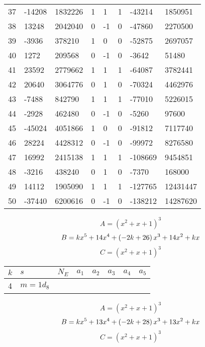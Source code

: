 \documentclass{amsart}
\begin{document}
\begin{longtable}{|l|l|l|lllll|}
37&-14208&1832226&1&1&1&-43214&1850951\\
38&13248&2042040&0&-1&0&-47860&2270500\\
39&-3936&378210&1&0&0&-52875&2697057\\
40&1272&209568&0&-1&0&-3642&51480\\
41&23592&2779662&1&1&1&-64087&3782441\\
42&20640&3064776&0&1&0&-70324&4462976\\
43&-7488&842790&1&1&1&-77010&5226015\\
44&-2928&462480&0&-1&0&-5260&97600\\
45&-45024&4051866&1&0&0&-91812&7117740\\
46&28224&4428312&0&-1&0&-99972&8276580\\
47&16992&2415138&1&1&1&-108669&9454851\\
48&-3216&438240&0&1&0&-7370&168000\\
49&14112&1905090&1&1&1&-127765&12431447\\
50&-37440&6200616&0&-1&0&-138212&14287620\\
\hline
\end{longtable}
$$A=(x^2
 + x
 + 1)^{3}$$
$$B=k\*x^5
 + 14\*x^4
 + \left(-2\*k
 + 26\right) \*x^3
 + 14\*x^2
 + k\*x$$
$$C=(x^2
 + x
 + 1)^{3}$$
\begin{longtable}{|l|l|l|lllll|}
\hline
$k$ & $s$ & $N_E$ & $a_1$ & $a_2$ & $a_3$ & $a_4$ & $a_5$\\
\hline
4&$m=1d_{8}$&&\multicolumn{5}{c|}{}\\
\hline
\end{longtable}
$$A=(x^2
 + x
 + 1)^{3}$$
$$B=k\*x^5
 + 13\*x^4
 + \left(-2\*k
 + 28\right) \*x^3
 + 13\*x^2
 + k\*x$$
$$C=(x^2
 + x
 + 1)^{3}$$
\end{document}
